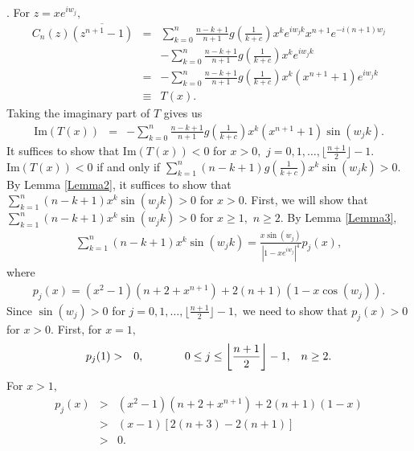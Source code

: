 \documentclass[final]{siamltex}
\begin{document}
. For $z = xe^{iw_{j}},$ 
 \begin{eqnarray*} C_{n}(z) \overline{ \left( z^{n+1}-1 \right) } & = & \sum_{k=0}^{n} \frac{n-k+1}{n+1} g \left(\frac{1}{k+c}\right)x^{k}e^{iw_{j}k}x^{n+1}e^{-i(n+1)w_{j}} \\ & & - \sum_{k=0}^{n} \frac{n-k+1}{n+1} g \left(\frac{1}{k+c} \right)x^{k}e^{iw_{j}k} \\ 
 & = & -\sum_{k=0}^{n} \frac{n-k+1}{n+1} g \left(\frac{1}{k+c}\right)x^{k}(x^{n+1}+1)e^{iw_{j}k} \\
 & \equiv & T(x). 
 \end{eqnarray*}
 Taking the imaginary part of $T$ gives us
 \begin{eqnarray*}
 \mbox{Im}(T(x)) & = & 
  -\sum_{k=0}^{n} \frac{n-k+1}{n+1} g \left(\frac{1}{k+c}\right)x^{k}(x^{n+1}+1)\sin(w_{j}k).
 \end{eqnarray*}
 It suffices to show that $\mbox{Im}(T(x)) < 0$ for $x > 0,$ $j = 0, 1 ,\ldots, \lfloor \frac{n+1}{2} \rfloor -1.$ 
 $\mbox{Im}(T(x)) < 0$ if and only if $\sum_{k=1}^{n} (n-k+1)
 g \left(\frac{1}{k+c}\right)x^{k}\sin(w_{j}k) > 0.$ 
  By Lemma \ref{Lemma2}, it suffices to show that $ \sum_{k=1}^{n} (n-k+1) x^{k}\sin(w_{j}k) > 0$ for $x > 0.$ 
 First, we will show that  $ \sum_{k=1}^{n} (n-k+1) x^{k}\sin(w_{j}k) > 0$ for $x \geq 1,$ $n \geq 2.$ 
 By Lemma \ref{Lemma3}, 
 \begin{eqnarray*} 
  \sum_{k=1}^{n} (n-k+1) x^{k}\sin(w_{j}k)  =  \frac{x\sin(w_{j})}{ \left| 1 - xe^{iw_{j}} \right| ^{4} } p_{j}(x), 
 \end{eqnarray*} where  
 \begin{eqnarray*}
  p_{j}(x) = (x^{2}-1)(n+2+x^{n+1}) + 2(n+1)(1-x\cos(w_{j})). 
 \end{eqnarray*}
  Since $\sin(w_{j}) > 0$ for $j = 0, 1, \ldots, \lfloor \frac{n+1}{2} \rfloor -1,$ we need to show that $p_{j}(x) > 0$ for $x > 0.$ 
  First, for $x = 1,$ 
 \begin{eqnarray*} p_{j}(1)
 & > & 0, \hspace{.5in}  0 \leq j \leq \left\lfloor \frac{n+1}{2} \right\rfloor -1, \;\;\; n \geq 2.
 \end{eqnarray*}
 For $x > 1,$ 
 \begin{eqnarray*} p_{j}(x) & > & (x^{2}-1)(n+2+x^{n+1}) + 2(n+1)(1-x) \\
 & > & (x-1) \left[ 2(n+3) - 2(n+1) \right]\\
 & > & 0.
 \end{eqnarray*}
 
\end{document}
